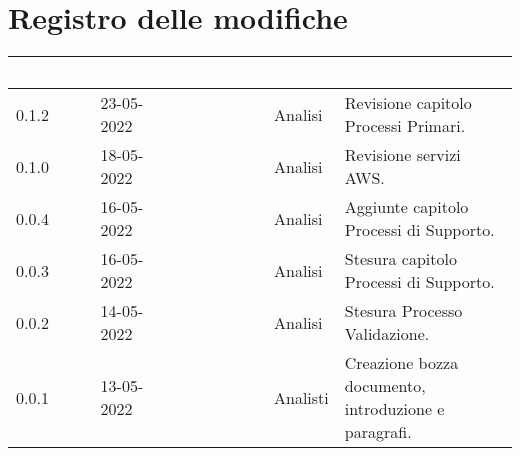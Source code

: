 \section*{Registro delle modifiche}
{

\newlength{\freewidth}
\setlength{\freewidth}{\dimexpr\textwidth-10\tabcolsep}
\renewcommand{\arraystretch}{1.5}
\centering
\setlength{\aboverulesep}{0pt}
\setlength{\belowrulesep}{0pt}
\begin{longtable}{C{.13\freewidth} C{.15\freewidth} C{.26\freewidth} C{.18\freewidth} C{.282379\freewidth}}
	\toprule
{}
\textcolor{white}{\textbf{Versione}}&
\textcolor{white}{\textbf{Data}}&
\textcolor{white}{\textbf{Nominativo}}&
\textcolor{white}{\textbf{Ruolo}}&
\textcolor{white}{\textbf{Descrizione}}\\	
\toprule
\endhead

0.1.2 & 23-05-2022 & \matteo{} & Analisi & Revisione capitolo Processi Primari.\\
0.1.0 & 18-05-2022 & \marcov{} & Analisi & Revisione servizi AWS.\\
0.0.4 & 16-05-2022 & \matteo{} & Analisi & Aggiunte capitolo Processi di Supporto.\\
0.0.3 & 16-05-2022 & \marcov{} & Analisi & Stesura capitolo Processi di Supporto.\\		
0.0.2 & 14-05-2022 & \matteo{} & Analisi & Stesura Processo Validazione.\\
0.0.1 & 13-05-2022 & \teamname{} & Analisti & Creazione bozza documento, introduzione e paragrafi.\\	
\bottomrule
\end{longtable}
}
